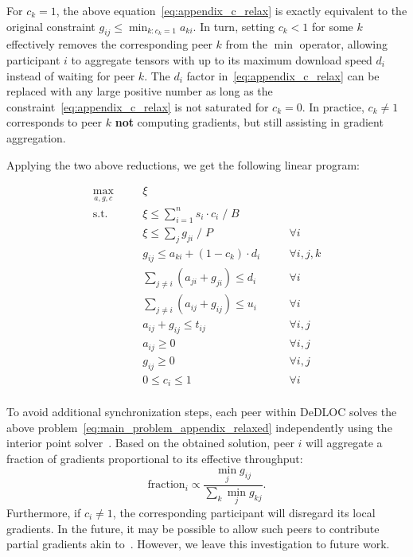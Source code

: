 For $c_k = 1$, the above equation~\eqref{eq:appendix_c_relax} is exactly equivalent to the original constraint $g_{i j} \leq \min_{k: c_k{=}1} a_{k i}$. In turn, setting $c_k < 1$ for some $k$ effectively removes the corresponding peer $k$ from the $\min$ operator, allowing participant $i$ to aggregate tensors with up to its maximum download speed $d_i$ instead of waiting for peer $k$. The $d_i$ factor in~\eqref{eq:appendix_c_relax} can be replaced with any large positive number as long as the constraint~\eqref{eq:appendix_c_relax} is not saturated for $c_k{=}0$. In practice, $c_k \neq 1$ corresponds to peer $k$ \textbf{not} computing gradients, but still assisting in gradient aggregation.

Applying the two above reductions, we get the following linear program:

\begin{equation}
\label{eq:main_problem_appendix_relaxed}
\begin{array}{rclll}
\underset{a, g, c}{\max} & & \xi &\quad&\\
\textrm{s.t. }  &\quad& \xi \leq \sum_{i=1}^n s_i \cdot c_i\; / \;B & & \\
                 &\quad & \xi \leq \sum_{j} g_{j i}\; / \;P  &\quad&\forall i  \\
                 &\quad & g_{ij} \leq a_{ki} + (1 - c_k) \cdot d_i  &\quad&\forall i, j, k \\
                 & \quad  & \sum_{j \neq i}\left( a_{j i} + g_{j i}\right) \leq d_{i} & \quad&\forall i \\
                 & \quad &   \sum_{j \neq i}\left( a_{i j} + g_{i j}\right) \leq u_{i} & \quad&\forall i \\
                 & \quad &   a_{i j} + g_{i j} \leq t_{i j} & \quad&\forall i, j \\
                 & \quad &   a_{i j} \geq 0& \quad&\forall i, j \\
                 & \quad &   g_{i j} \geq 0& \quad&\forall i, j \\
                 & \quad &  0 \leq c_i \leq 1 & \quad&\forall i \\
\end{array}
\end{equation}

To avoid additional synchronization steps, each peer within DeDLOC solves the above problem~\eqref{eq:main_problem_appendix_relaxed} independently using the interior point solver~\cite{andersen}. Based on the obtained solution, peer $i$ will aggregate a fraction of gradients proportional to its effective throughput: 
\begin{equation}
\text{fraction}_i \propto \frac{\min_j g_{ij}}{ \sum_k \min_j g_{kj}}.
\end{equation}
Furthermore, if $c_i\neq1$, the corresponding participant will disregard its local gradients. In the future, it may be possible to allow such peers to contribute partial gradients akin to~\cite{deepgradientcompression}. However, we leave this investigation to future work.

